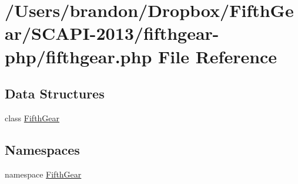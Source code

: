 \hypertarget{fifthgear_8php}{\section{/\-Users/brandon/\-Dropbox/\-Fifth\-Gear/\-S\-C\-A\-P\-I-\/2013/fifthgear-\/php/fifthgear.php File Reference}
\label{fifthgear_8php}
}
\subsection*{Data Structures}
\begin{DoxyCompactItemize}
\item 
class \hyperlink{class_fifth_gear}{Fifth\-Gear}
\end{DoxyCompactItemize}
\subsection*{Namespaces}
\begin{DoxyCompactItemize}
\item 
namespace \hyperlink{namespace_fifth_gear}{Fifth\-Gear}
\end{DoxyCompactItemize}
